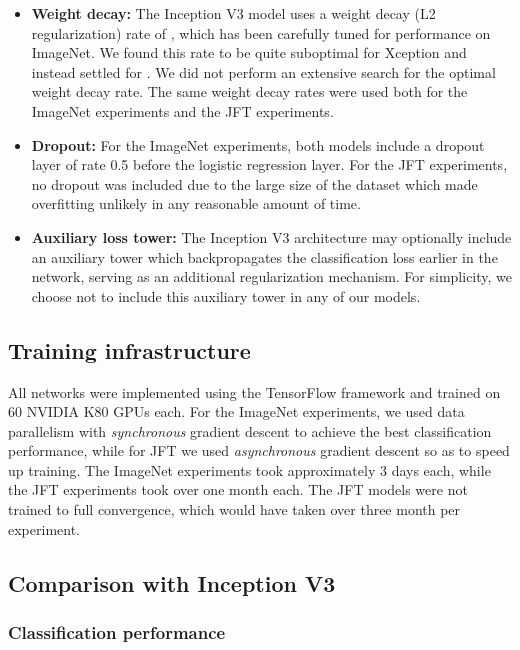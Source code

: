 \documentclass[10pt,twocolumn,letterpaper]{article}
\begin{document}
\begin{itemize}
\item \textbf{Weight decay:} The Inception V3 model uses a weight decay (L2 regularization) rate of , which has been carefully tuned for performance on ImageNet. We found this rate to be quite suboptimal for Xception and instead settled for . We did not perform an extensive search for the optimal weight decay rate. The same weight decay rates were used both for the ImageNet experiments and the JFT experiments.

\item \textbf{Dropout:} For the ImageNet experiments, both models include a dropout layer of rate 0.5 before the logistic regression layer. For the JFT experiments, no dropout was included due to the large size of the dataset which made overfitting unlikely in any reasonable amount of time.

\item \textbf{Auxiliary loss tower:} The Inception V3 architecture may optionally include an auxiliary tower which backpropagates the classification loss earlier in the network, serving as an additional regularization mechanism. For simplicity, we choose not to include this auxiliary tower in any of our models.

\end{itemize}


\subsection{Training infrastructure}

All networks were implemented using the TensorFlow framework \cite{tensorflow2015-whitepaper} and trained on 60 NVIDIA K80 GPUs each. For the ImageNet experiments, we used data parallelism with \textit{synchronous} gradient descent to achieve the best classification performance, while for JFT we used \textit{asynchronous} gradient descent so as to speed up training. The ImageNet experiments took approximately 3 days each, while the JFT experiments took over one month each. The JFT models were not trained to full convergence, which would have taken over three month per experiment.


\subsection{Comparison with Inception V3}

\subsubsection{Classification performance}
\end{document}
